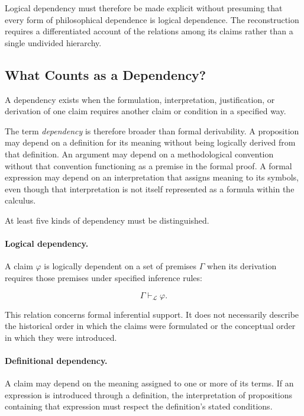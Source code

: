 Logical dependency must therefore be made explicit without
presuming that every form of philosophical dependence is logical
dependence. The reconstruction requires a differentiated account
of the relations among its claims rather than a single undivided
hierarchy.

\subsection{What Counts as a Dependency?}

A dependency exists when the formulation, interpretation,
justification, or derivation of one claim requires another claim
or condition in a specified way.

The term \emph{dependency} is therefore broader than formal
derivability. A proposition may depend on a definition for its
meaning without being logically derived from that definition.
An argument may depend on a methodological convention without
that convention functioning as a premise in the formal proof.
A formal expression may depend on an interpretation that assigns
meaning to its symbols, even though that interpretation is not
itself represented as a formula within the calculus.

At least five kinds of dependency must be distinguished.

\paragraph{Logical dependency.}

A claim \(\varphi\) is logically dependent on a set of premises
\(\Gamma\) when its derivation requires those premises under
specified inference rules:

\[
    \Gamma \vdash_{\mathcal{L}} \varphi.
\]

This relation concerns formal inferential support. It does not
necessarily describe the historical order in which the claims
were formulated or the conceptual order in which they were
introduced.

\paragraph{Definitional dependency.}

A claim may depend on the meaning assigned to one or more of
its terms. If an expression is introduced through a definition,
the interpretation of propositions containing that expression
must respect the definition's stated conditions.

